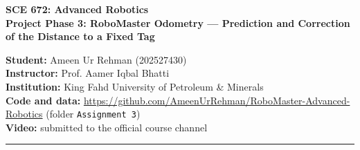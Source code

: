 \documentclass[11pt,a4paper]{article}
\newcommand{\videolink}{submitted to the official course channel}
\begin{document}
\begin{center}
{\LARGE\bfseries SCE 672: Advanced Robotics}\\[5pt]
{\large\bfseries Project Phase 3: RoboMaster Odometry --- Prediction and Correction of the Distance to a Fixed Tag}
\end{center}
\noindent\textbf{Student:} Ameen Ur Rehman (202527430)\\
\textbf{Instructor:} Prof. Aamer Iqbal Bhatti\\
\textbf{Institution:} King Fahd University of Petroleum \& Minerals\\
\textbf{Code and data:} \url{https://github.com/AmeenUrRehman/RoboMaster-Advanced-Robotics} (folder \texttt{Assignment 3})\\
\textbf{Video:} \videolink
\par\vspace{2pt}\noindent\rule{\linewidth}{0.8pt}

\begin{abstract}\noindent
A DJI RoboMaster EP Core, controlled from Ubuntu~24.04 through the RoboMaster Python SDK over USB, faces an upright AprilTag (Tag~3, \texttt{tag36h11}, 15\,cm) at a fixed starting distance of \ResStart\,m, detects it, and drives straight towards it until its estimated distance reaches the stopping distance of \ResStop\,m.
The distance to the tag is estimated by a one-dimensional Kalman filter: the \emph{prediction} step uses the forward displacement from wheel odometry, and the \emph{correction} step uses the camera distance to the tag plane recovered from the AprilTag pose (perspective-$n$-point), after a linear calibration and a latency compensation.
The experiment was repeated \ResN{} times under the same start conditions. For every trial the final estimate is compared with an independent tape measurement taken to the same reference point on the robot, and the error is $e_i=\hat d_i-d_i$.
The fused estimate has a mean absolute error of \ResMAE\,mm and a range of errors of \ResRange\,mm (from \ResMin{} to \ResMax\,mm). For comparison, odometry alone (prediction without correction) gives \ResOdomMAE\,mm and the camera alone gives \ResCamMAE\,mm.
All numbers in the results come from the logged robot runs and the tape measurements; the simulator in the repository was only used to test the code.
\end{abstract}
\end{document}
